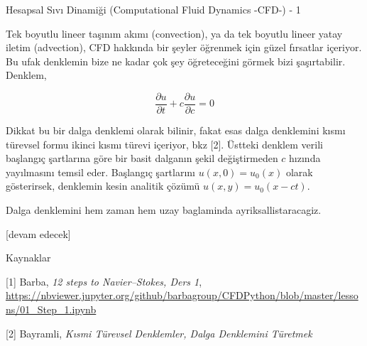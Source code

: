 \documentclass[12pt,fleqn]{article}\usepackage{../../common}
\begin{document}
Hesapsal Sıvı Dinamiği (Computational Fluid Dynamics -CFD-) - 1

Tek boyutlu lineer taşınım akımı (convection), ya da tek boyutlu lineer yatay
iletim (advection), CFD hakkında bir şeyler öğrenmek için güzel fırsatlar
içeriyor. Bu ufak denklemin bize ne kadar çok şey öğreteceğini görmek bizi
şaşırtabilir. Denklem,

$$
\frac{\partial u}{\partial t} +
c \frac{\partial u}{\partial c}  = 0
$$

Dikkat bu bir dalga denklemi olarak bilinir, fakat esas dalga denklemini kısmı
türevsel formu ikinci kısmı türevi içeriyor, bkz [2]. Üstteki denklem verili
başlangıç şartlarına göre bir basit dalganın şekil değiştirmeden $c$ hızında
yayılmasını temsil eder. Başlangıç şartlarını $u(x,0) = u_0(x)$ olarak
gösterirsek, denklemin kesin analitik çözümü $u(x,y) = u_0(x-ct)$. 

Dalga denklemini hem zaman hem uzay baglaminda ayriksallistaracagiz. 















[devam edecek]

Kaynaklar

[1] Barba, {\em 12 steps to Navier–Stokes, Ders 1},
    \url{https://nbviewer.jupyter.org/github/barbagroup/CFDPython/blob/master/lessons/01_Step_1.ipynb}

[2] Bayramli, {\em Kısmi Türevsel Denklemler, Dalga Denklemini Türetmek}
\end{document}
